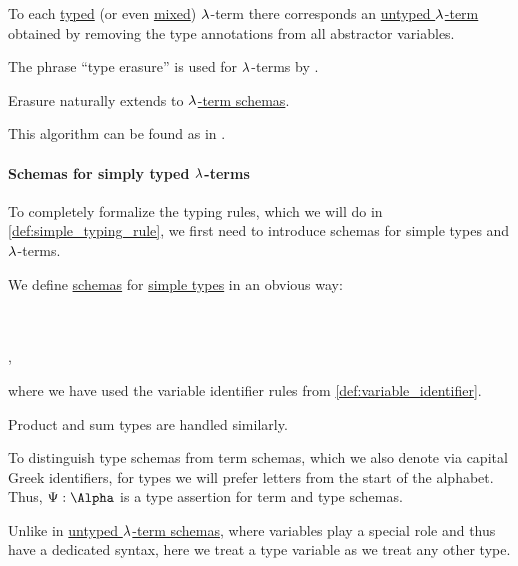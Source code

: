 \begin{algorithm}\label{alg:type_erasure}
  To each \hyperref[def:typed_lambda_term]{typed} (or even \hyperref[rem:mixed_lambda_term]{mixed}) \( {\mathrm \lambda} \)-term there corresponds an \hyperref[def:lambda_term]{untyped \( {\mathrm \lambda} \)-term} obtained by removing the type annotations from all abstractor variables.
\end{algorithm}
\begin{comments}
  \item The phrase \enquote{type erasure} is used for \( {\mathrm \lambda} \)-terms by .
  \item Erasure naturally extends to \hyperref[def:simple_type_schema]{\( {\mathrm \lambda} \)-term schemas}.
  \item This algorithm can be found as  in \cite{notebook:code}.
\end{comments}

\paragraph{Schemas for simply typed \( {\mathrm \lambda} \)-terms}

To completely formalize the typing rules, which we will do in \cref{def:simple_typing_rule}, we first need to introduce schemas for simple types and \( {\mathrm \lambda} \)-terms.

\begin{definition}\label{def:simple_type_schema}
  We define \hyperref[con:schemas_and_instances]{schemas} for \hyperref[def:simple_type]{simple types} in an obvious way:
  \begin{bnf*}
        {} \\
       {\bnftsq{(} \bnfsp {} \bnfsp \bnftsq{\( \synimplies \)} \bnfsp {} \bnfsp \bnftsq{)}} \\
             { \bnfor {} \bnfor {}},
  \end{bnf*}
  where we have used the variable identifier rules from \cref{def:variable_identifier}.

  Product and sum types are handled similarly.
\end{definition}
\begin{comments}
  \item To distinguish type schemas from term schemas, which we also denote via capital Greek identifiers, for types we will prefer letters from the start of the alphabet. Thus, \( \Psi: \Alpha \) is a type assertion for term and type schemas.

  \item Unlike in \hyperref[def:lambda_term_schema]{untyped \( {\mathrm \lambda} \)-term schemas}, where variables play a special role and thus have a dedicated syntax, here we treat a type variable as we treat any other type.
\end{comments}

